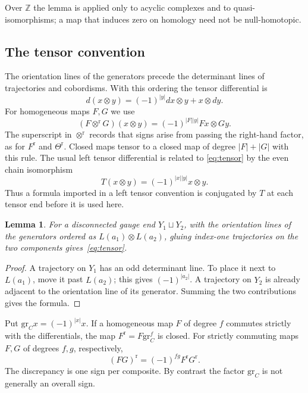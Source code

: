 \documentclass[11pt]{amsart}
\newtheorem{lemma}[theorem]{Lemma}
\theoremstyle{definition}
\theoremstyle{remark}
\theoremstyle{plain}
\numberwithin{equation}{section}
\newcommand{\ZZ}{\mathbb Z}
\newcommand{\eps}{\mathrm{gr}}
\begin{document}
Over $\ZZ$ the lemma is applied only to acyclic complexes and to
quasi-isomorphisms; a map that induces zero on homology need not be
null-homotopic.

\subsection{The tensor convention}
The orientation lines of the generators precede the determinant
lines of trajectories and cobordisms. With this ordering the tensor
differential is
\begin{equation}\label{eq:tensor}
 d(x\otimes y)=(-1)^{|y|}dx\otimes y+x\otimes dy.
\end{equation}
For homogeneous maps $F,G$ we use
\begin{equation}\label{eq:tensor-maps}
 (F\otimes^{\mathrm r} G)(x\otimes y)
   =(-1)^{|F||y|}Fx\otimes Gy.
\end{equation}
The superscript in $\otimes^{\mathrm r}$ records that signs arise from passing the right-hand factor, as for $F^{\mathrm r}$ and $\Theta^{\mathrm r}$. Closed maps tensor to a closed map of degree $|F|+|G|$ with
this rule. The usual left tensor differential is related to
\eqref{eq:tensor} by the even chain isomorphism
\[
 T(x\otimes y)=(-1)^{|x||y|}x\otimes y.
\]
Thus a formula imported in a left tensor convention is conjugated
by $T$ at each tensor end before it is used here.

\begin{lemma}\label{lem:tensor-geometric}
For a disconnected gauge end $Y_1\sqcup Y_2$, with the orientation
lines of the generators ordered as $L(a_1)\otimes L(a_2)$, gluing index-one
trajectories on the two components gives~\eqref{eq:tensor}.
\end{lemma}
\begin{proof}
A trajectory on $Y_1$ has an odd determinant line. To place it
next to $L(a_1)$, move it past $L(a_2)$; this gives
$(-1)^{|a_2|}$. A trajectory on $Y_2$ is already adjacent to
the orientation line of its generator. Summing the two contributions gives the
formula.
\end{proof}

Put $\eps_Cx=(-1)^{|x|}x$. If a homogeneous map $F$ of degree
$f$ commutes strictly with the differentials, the map
$F^{\mathrm r}=F\eps_C^f$ is closed. For strictly commuting
maps $F,G$ of degrees $f,g$, respectively,
\begin{equation}\label{eq:right-conversion}
 (FG)^{\mathrm r}=(-1)^{fg}F^{\mathrm r}G^{\mathrm r}.
\end{equation}
The discrepancy is one sign per composite. By contrast the
factor $\eps_C$ is not generally an overall sign.
\end{document}
